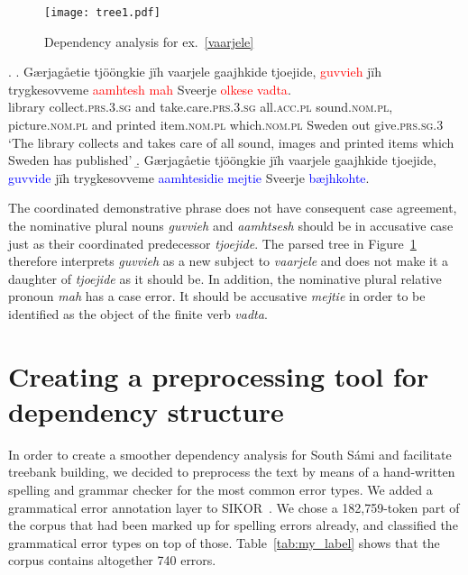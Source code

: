 \documentclass[free]{flammie}
\begin{document}
\begin{figure}
    \centering
    \texttt{[image: tree1.pdf]}
    \caption{Dependency analysis for ex.~\ref{vaarjele}\label{fig:tree1}}
\end{figure}

\ex.
\ag. Gærjagåetie tjööngkie jïh vaarjele gaajhkide tjoejide,
\textcolor{red}{guvvieh} jïh trygkesovveme \textcolor{red}{aamhtesh}
\textcolor{red}{mah} Sveerje \textcolor{red}{olkese}
\textcolor{red}{vadta}.\label{vaarjele}\\
library collect\textsc{.prs.3.sg} and take.care\textsc{.prs.3.sg}
all\textsc{.acc.pl} sound\textsc{.nom.pl}, picture\textsc{.nom.pl} and printed
item\textsc{.nom.pl} which\textsc{.nom.pl} Sweden out give\textsc{.prs.sg.3}\\
`The library collects and takes care of all sound, images and printed items
which Sweden has published'
\b. Gærjagåetie tjööngkie jïh vaarjele gaajhkide tjoejide,
\textcolor{blue}{guvvide} jïh trygkesovveme \textcolor{blue}{aamhtesidie}
\textcolor{blue}{mejtie} Sveerje \textcolor{blue}{bæjhkohte}.\label{vaarjele2}

The coordinated demonstrative phrase does not have consequent case agreement,
the nominative plural nouns \textit{guvvieh} and \textit{aamhtsesh} should be in
accusative case just as their coordinated predecessor \textit{tjoejide}.  The
parsed tree in Figure~\ref{fig:tree1} therefore interprets \textit{guvvieh} as a
new subject to \textit{vaarjele} and does not make it a daughter of
\textit{tjoejide} as it should be. In addition, the nominative plural relative
pronoun \textit{mah} has a case error. It should be accusative \textit{mejtie}
in order to be identified as the object of the finite verb \textit{vadta}.

\section{Creating a preprocessing tool for dependency structure}

In order to create a smoother dependency analysis for South Sámi and facilitate
treebank building, we decided to preprocess the text by means of a hand-written
spelling and grammar checker for the most common error types. We added a
grammatical error annotation layer to SIKOR~\cite{sikor_06.11.2018}. We chose a
182,759-token part of the corpus that had been marked up for spelling errors
already, and classified the grammatical error types on top of those.
Table~\ref{tab:my_label} shows that the corpus contains altogether 740 errors.
\end{document}

